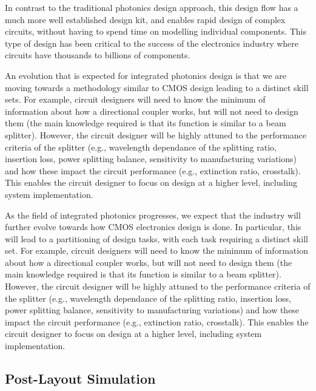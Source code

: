 \documentclass[journal]{spie}
\begin{document}
In contrast to the traditional photonics design approach, this design flow has a much more well established design kit, and enables rapid design of complex circuits, without having to spend time on modelling individual components.  This type of design has been critical to the success of the electronics industry where circuits have thousands to billions of components.

An evolution that is expected for integrated photonics design is that we are moving towards a methodology similar to CMOS design leading to a distinct skill sets.  For example, circuit designers will need to know the minimum of information about how a directional coupler works, but will not need to design them (the main knowledge required is that its function is similar to a beam splitter).  However, the circuit designer will be highly attuned to the performance criteria of the splitter (e.g., wavelength dependance of the splitting ratio, insertion loss, power splitting balance, sensitivity to manufacturing variations) and how these impact the circuit performance (e.g., extinction ratio, crosstalk).  This enables the circuit designer to focus on design at a higher level, including system implementation.


As the field of integrated photonics progresses, we expect that the industry will further evolve towards how CMOS electronics design is done.  In particular, this will lead to a partitioning of design tasks, with each task requiring a distinct skill set.
For example, circuit designers will need to know the minimum of information about how a directional coupler works, but will not need to design them (the main knowledge required is that its function is similar to a beam splitter).  However, the circuit designer will be highly attuned to the performance criteria of the splitter (e.g., wavelength dependance of the splitting ratio, insertion loss, power splitting balance, sensitivity to manufacturing variations) and how these impact the circuit performance (e.g., extinction ratio, crosstalk).  This enables the circuit designer to focus on design at a higher level, including system implementation.


\subsection{Post-Layout Simulation}
\end{document}
